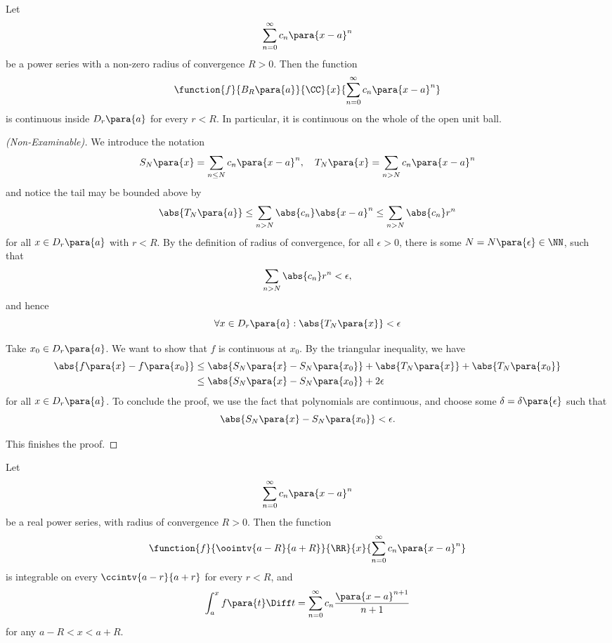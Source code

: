 \begin{proposition}
    \label{prop:continuity-of-power-series}%
    Let
    \[
        \sum_{n = 0}^{\infty} c_n \para{x - a}^{n}
    \]
    be a power series with a non-zero radius of convergence \(R > 0\). Then the function
    \[
        \function{f}{B_R \para{a}}{\CC}{x}{\sum_{n = 0}^{\infty} c_n \para{x - a}^n}
    \]
    is continuous inside \(D_r\para{a}\) for every \(r < R\). In particular, it is continuous on the whole of the open unit ball.
\end{proposition}

\begin{proof}[(Non-Examinable)]
    We introduce the notation
    \[
        S_N\para{x} = \sum_{n \leq N} c_n \para{x - a}^n, \quad T_N\para{x} = \sum_{n > N} c_n \para{x - a}^n
    \]
    and notice the tail may be bounded above by
    \[
        \abs{T_N\para{a}} \leq \sum_{n > N} \abs{c_n} \abs{x - a}^n \leq \sum_{n > N} \abs{c_n} r^n
    \]
    for all \(x \in D_r\para{a}\) with \(r < R\). By the definition of radius of convergence, for all \(\epsilon > 0\), there is some \(N = N \para{\epsilon} \in \NN\), such that
    \[
        \sum_{n > N} \abs{c_n} r^n < \epsilon,
    \]
    and hence
    \[
        \forall x \in D_r\para{a}: \abs{T_N\para{x}} < \epsilon
    \]

    Take \(x_0 \in D_r\para{a}\). We want to show that \(f\) is continuous at \(x_0\). By the triangular inequality, we have
    \begin{align*}
        \abs{f\para{x} - f\para{x_0}} &\leq \abs{S_N\para{x} - S_N\para{x_0}} + \abs{T_N\para{x}} + \abs{T_N \para{x_0}} \\
        &\leq \abs{S_N\para{x} - S_N\para{x_0}} + 2 \epsilon
    \end{align*}
    for all \(x \in D_r\para{a}\). To conclude the proof, we use the fact that polynomials are continuous, and choose some \(\delta = \delta\para{\epsilon}\) such that
    \[
        \abs{S_N\para{x} - S_N\para{x_0}} < \epsilon.
    \]

    This finishes the proof.
\end{proof}

\begin{proposition}
    \label{prop:integrability-of-power-series-term-by-term}%
    Let
    \[
        \sum_{n = 0}^{\infty} c_n \para{x - a}^n
    \]
    be a real power series, with radius of convergence \(R > 0\). Then the function
    \[
        \function{f}{\oointv{a - R}{a + R}}{\RR}{x}{\sum_{n = 0}^{\infty} c_n \para{x - a}^n}  
    \]
    is integrable on every \(\ccintv{a - r}{a + r}\) for every \(r < R\), and
    \[
        \int_{a}^{x} f\para{t} \Diff t = \sum_{n = 0}^{\infty} c_n \frac{\para{x - a}^{n + 1}}{n + 1}
    \]
    for any \(a - R < x < a + R\).
\end{proposition}

